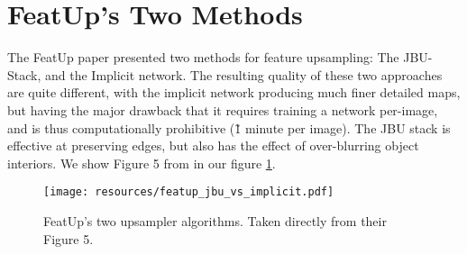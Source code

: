 \section{FeatUp's Two Methods}

The FeatUp \citep{fu2024featup} paper presented two methods for feature upsampling: The JBU-Stack, and the Implicit network. The resulting quality of these two approaches are quite different, with the implicit network producing much finer detailed maps, but having the major drawback that it requires training a network per-image, and is thus computationally prohibitive (\~1 minute per image). The JBU stack is effective at preserving edges, but also has the effect of over-blurring object interiors. We show Figure 5 from \cite{fu2024featup} in our figure \ref{fig:featup_jbu_vs_implicit}.

\begin{figure}[h]
    \centering
    \texttt{[image: resources/featup\_jbu\_vs\_implicit.pdf]}
    \vspace{-17mm}
    \caption{FeatUp's two upsampler algorithms. Taken directly from their \cite{fu2024featup} Figure 5.}
    \label{fig:featup_jbu_vs_implicit}
\end{figure}